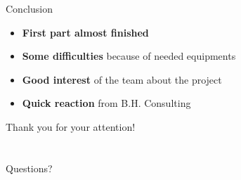 \documentclass[12pt]{beamer}
\begin{document}
\begin{frame}{Conclusion}
    \begin{itemize}
	\item \textbf{First part almost finished}
	\vfill
	\item \textbf{Some difficulties} because of needed equipments
	\vfill
	\item \textbf{Good interest} of the team about the project
	\vfill
	\item \textbf{Quick reaction} from B.H. Consulting
    \end{itemize}
\end{frame}

\begin{frame}{}
    \begin{center}
	{\huge{Thank you for your attention!\\~\\~\\}}
	{\huge{Questions?}}
    \end{center}
\end{frame}
\end{document}
